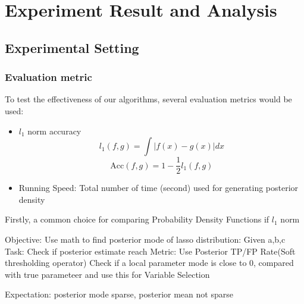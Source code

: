 \chapter{Experiment Result and Analysis}
\label{Chapter4}
\section{Experimental Setting}
\subsection{Evaluation metric}
To test the effectiveness of our algorithms, several evaluation metrics would be used:

\begin{itemize}
	\item $l_1$ norm accuracy 
    \begin{equation}
		l_1(f,g) = \int |f(x)-g(x)|dx
	\end{equation}
	\begin{equation}
		\text{Acc}(f,g) = 1 - \frac{1}{2}l_1(f,g) 
	\end{equation}
    \item Running Speed: Total number of time (second) used for generating posterior density
	
\end{itemize}

Firstly, a common choice for comparing Probability Density Functions if $l_1$ norm


Objective: Use math to find posterior mode of lasso distribution: Given a,b,c
Task: Check if posterior estimate reach 
Metric: Use Posterior TP/FP Rate(Soft thresholding operator) Check if a local parameter mode is close to 0, compared with true parameteer and use this for 
Variable Selection

Expectation: posterior mode sparse, posterior mean not sparse

